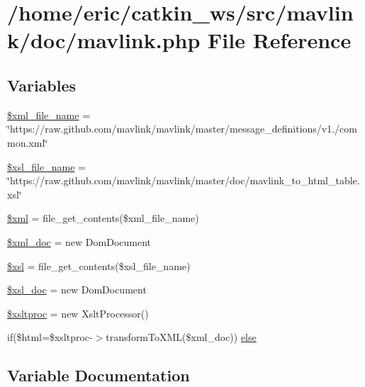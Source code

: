 \hypertarget{mavlink_8php}{}\section{/home/eric/catkin\+\_\+ws/src/mavlink/doc/mavlink.php File Reference}
\label{mavlink_8php}
\subsection*{Variables}
\begin{DoxyCompactItemize}
\item 
\mbox{\hyperlink{mavlink_8php_a6a37156e263b8771c328e65e8ed50a00}{\$xml\+\_\+file\+\_\+name}} = \char`\"{}https\+://raw.\+github.\+com/mavlink/mavlink/master/message\+\_\+definitions/v1./common.\+xml\char`\"{}
\item 
\mbox{\hyperlink{mavlink_8php_a3c56457e5925d0714518b8d02072e54b}{\$xsl\+\_\+file\+\_\+name}} = \char`\"{}https\+://raw.\+github.\+com/mavlink/mavlink/master/doc/mavlink\+\_\+to\+\_\+html\+\_\+table.\+xsl\char`\"{}
\item 
\mbox{\hyperlink{mavlink_8php_aa108d9d91e700ac530401dd363b0723b}{\$xml}} = file\+\_\+get\+\_\+contents(\$xml\+\_\+file\+\_\+name)
\item 
\mbox{\hyperlink{mavlink_8php_a9c4d77053c2d34a9ef513cb3f9cc6dbf}{\$xml\+\_\+doc}} = new Dom\+Document
\item 
\mbox{\hyperlink{mavlink_8php_ad9e3770eadb2e480192f3558b655f4f2}{\$xsl}} = file\+\_\+get\+\_\+contents(\$xsl\+\_\+file\+\_\+name)
\item 
\mbox{\hyperlink{mavlink_8php_a0191bf1e4de19c8651ca09ed76d867b3}{\$xsl\+\_\+doc}} = new Dom\+Document
\item 
\mbox{\hyperlink{mavlink_8php_a4bddc543900c2c6eea663bd9130f1929}{\$xsltproc}} = new Xslt\+Processor()
\item 
if(\$html=\$xsltproc-\/$>$transform\+To\+X\+ML(\$xml\+\_\+doc)) \mbox{\hyperlink{mavlink_8php_a33f222928d1e5db001c1bb5b39a2ed2f}{else}}
\end{DoxyCompactItemize}


\subsection{Variable Documentation}
\mbox{\label{mavlink_8php_aa108d9d91e700ac530401dd363b0723b}} 
